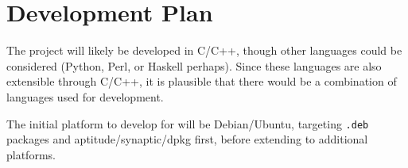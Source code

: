 \documentclass[10pt]{article}
\begin{document}
    \section{Development Plan}
        The project will likely be developed in C/C++, though other languages could be considered (Python, Perl, or Haskell perhaps).  Since these languages are also extensible through C/C++, it is plausible that there would be a combination of languages used for development.

        The initial platform to develop for will be Debian/Ubuntu, targeting \verb+.deb+ packages and aptitude/synaptic/dpkg first, before extending to additional platforms.
    
\end{document}
